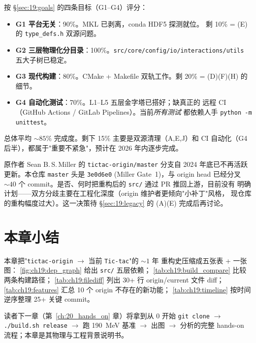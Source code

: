 按 §\ref{sec:19:goals} 的四条目标（G1--G4）评分：

\begin{itemize}
\item \textbf{G1 平台无关}：90\%。MKL 已剥离，conda HDF5 探测就位。
      剩 10\% = (E) 的 \texttt{type\_defs.h} 双源问题。
\item \textbf{G2 三层物理化分目录}：100\%。\texttt{src/core/config/io/interactions/utils}
      五大子树已稳定。
\item \textbf{G3 现代构建}：80\%。CMake + Makefile 双轨工作。剩 20\% =
      (D)(F)(H) 的细节。
\item \textbf{G4 自动化测试}：70\%。L1--L5 五层金字塔已搭好；缺真正的
      远程 CI（GitHub Actions / GitLab Pipelines）。当前\emph{所有测试}
      都依赖人手 \texttt{python -m unittest}。
\end{itemize}

总体平均 ${\sim}85\%$ 完成度。剩下 15\% 主要是双源清理（A,E,J）和
CI 自动化（G4 后半），都属于"重要不紧急"，预计在
2026 年内逐步完成。

\begin{remark}[与上游同步的可能性]
原作者 Sean B.\,S.\,Miller 的 \texttt{tictac-origin/master} 分支自
2024 年底已不再活跃更新。本仓库 \texttt{master} 头是
\texttt{3e0d6e0} (Miller Gate~1)，与 origin head 已经分叉 ${\sim}40$ 个
commit。是否、何时把重构后的 \texttt{src/} 通过 PR 推回上游，目前没有
明确计划——双方分歧主要在工程化深度（origin 维护者更倾向"小补丁"风格，
现仓库的重构幅度过大）。这一决策待 §\ref{sec:19:legacy} 的 (A)(E)
完成后再讨论。
\end{remark}

\section{本章小结}

本章把"\texttt{tictac-origin} $\to$ 当前 \texttt{Tic-tac}"的 ${\sim}1$ 年
重构史压缩成五张表 + 一张图：
%
\cref{fig:ch19:dep_graph} 给出 \texttt{src/} 五层依赖；
\cref{tab:ch19:build_compare} 比较两条构建路径；
\cref{tab:ch19:filediff} 列出 30+ 行 origin/current 文件 diff；
\cref{tab:ch19:features} 汇总 10 个 origin 不存在的新功能；
\cref{tab:ch19:timeline} 按时间逆序整理 25+ 关键 commit。

读者下一章（第~\ref{ch:20_hands_on} 章）将拿到从 0 开始 \texttt{git clone}
$\to$ \texttt{./build.sh release} $\to$ 跑 190~MeV 基准 $\to$ 出图 $\to$
分析的完整 hands-on 流程；本章是其物理与工程背景说明书。
